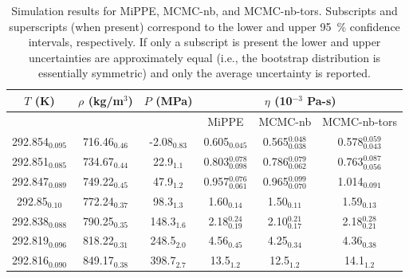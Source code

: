 \documentclass[preprint,review,12pt]{elsarticle}
\begin{document}
	\begin{table}[htb!]
		\caption{Simulation results for MiPPE, MCMC-nb, and MCMC-nb-tors. Subscripts and superscripts (when present) correspond to the lower and upper 95~\% confidence intervals, respectively. If only a subscript is present the lower and upper uncertainties are approximately equal (i.e., the bootstrap distribution is essentially symmetric) and only the average uncertainty is reported.} \label{tab:tabulated_values}
		\begin{center}
			\begin{tabular}{|c|c|c|c|c|c|}
				\hline
				\multicolumn{1}{|c}{$T$ (K)} & \multicolumn{1}{|c}{$\rho$ (kg/m$^3$)} & \multicolumn{1}{|c}{$P$ (MPa)} & \multicolumn{3}{|c|}{$\eta$ (10$^{-3}$ Pa-s)} \\ \hline
				 &  &  & MiPPE & MCMC-nb & MCMC-nb-tors \\ \hline 
				292.854$_{0.095}$ & 	716.46$_{0.46}$ & 	-2.08$_{0.83}$ & 	0.605$_{0.045}$ & 	0.565$^{0.048}_{0.038}$ & 	0.578$^{0.059}_{0.043}$ \\
				292.851$_{0.085}$ & 	734.67$_{0.44}$ & 	22.9$_{1.1}$ & 	0.803$^{0.078}_{0.098}$ & 	0.786$^{0.079}_{0.062}$ & 	0.763$^{0.087}_{0.056}$ \\
				292.847$_{0.089}$ & 	749.22$_{0.45}$ & 	47.9$_{1.2}$ & 	0.957$^{0.076}_{0.061}$ & 	0.965$^{0.099}_{0.070}$ & 	1.014$_{0.091}$ \\
				292.85$_{0.10}$ & 	772.24$_{0.37}$ & 	98.3$_{1.3}$ & 	1.60$_{0.14}$ & 	1.50$_{0.11}$ & 	1.59$_{0.13}$ \\
				292.838$_{0.088}$ & 	790.25$_{0.35}$ & 	148.3$_{1.6}$ & 	2.18$^{0.24}_{0.19}$ & 	2.10$^{0.21}_{0.17}$ & 	2.18$^{0.28}_{0.21}$ \\
				292.819$_{0.096}$ & 	818.22$_{0.31}$ & 	248.5$_{2.0}$ & 	4.56$_{0.45}$ & 	4.25$_{0.34}$ & 	4.36$_{0.38}$ \\
				292.816$_{0.090}$ & 	849.17$_{0.38}$ & 	398.7$_{2.7}$ & 	13.5$_{1.2}$ & 	12.5$_{1.2}$ & 	14.1$_{1.2}$ \\

\end{tabular}
\end{center}
\end{table}
\end{document}
